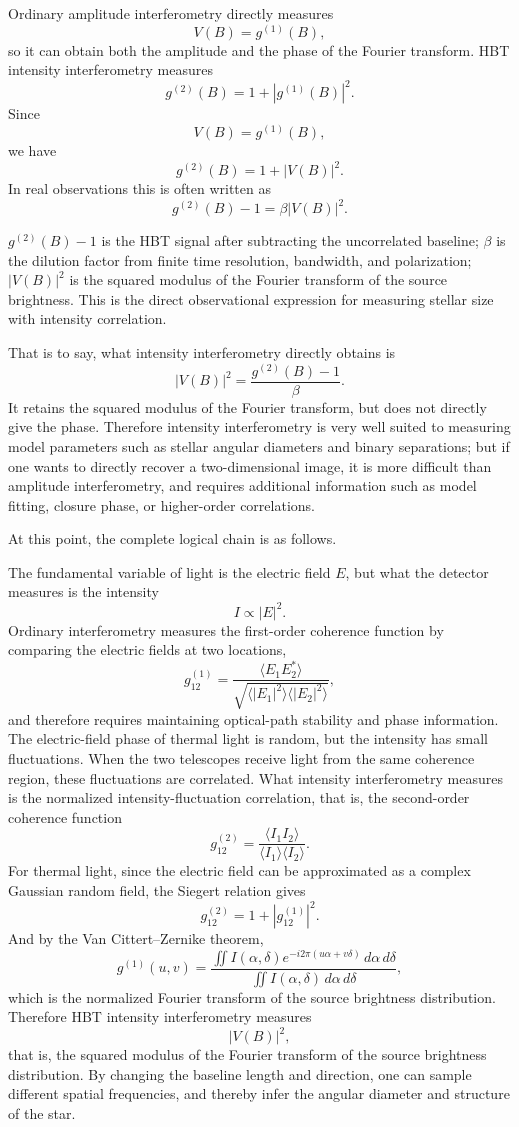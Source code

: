Ordinary amplitude interferometry directly measures
\[
  V(B)=g^{(1)}(B),
\]
so it can obtain both the amplitude and the phase of the Fourier transform. HBT intensity interferometry measures
\[
  g^{(2)}(B)=1+|g^{(1)}(B)|^2.
\]
Since
\[
  V(B)=g^{(1)}(B),
\]
we have
\[
  g^{(2)}(B)=1+|V(B)|^2.
\]
In real observations this is often written as
\[
  g^{(2)}(B)-1
  =
  \beta |V(B)|^2.
\]
\begin{formulaexplain}
\(g^{(2)}(B)-1\) is the HBT signal after subtracting the uncorrelated baseline; \(\beta\) is the dilution factor from finite time resolution, bandwidth, and polarization; \(|V(B)|^2\) is the squared modulus of the Fourier transform of the source brightness. This is the direct observational expression for measuring stellar size with intensity correlation.
\end{formulaexplain}
That is to say, what intensity interferometry directly obtains is
\[
  |V(B)|^2
  =
  \frac{g^{(2)}(B)-1}{\beta}.
\]
It retains the squared modulus of the Fourier transform, but does not directly give the phase. Therefore intensity interferometry is very well suited to measuring model parameters such as stellar angular diameters and binary separations; but if one wants to directly recover a two-dimensional image, it is more difficult than amplitude interferometry, and requires additional information such as model fitting, closure phase, or higher-order correlations.

At this point, the complete logical chain is as follows.

The fundamental variable of light is the electric field \(E\), but what the detector measures is the intensity
\[
  I\propto |E|^2.
\]
Ordinary interferometry measures the first-order coherence function by comparing the electric fields at two locations,
\[
  g^{(1)}_{12}
  =
  \frac{
    \langle E_1E_2^\ast\rangle
  }{
    \sqrt{
      \langle |E_1|^2\rangle
      \langle |E_2|^2\rangle
    }
  },
\]
and therefore requires maintaining optical-path stability and phase information. The electric-field phase of thermal light is random, but the intensity has small fluctuations. When the two telescopes receive light from the same coherence region, these fluctuations are correlated. What intensity interferometry measures is the normalized intensity-fluctuation correlation, that is, the second-order coherence function
\[
  g^{(2)}_{12}
  =
  \frac{
    \langle I_1I_2\rangle
  }{
    \langle I_1\rangle\langle I_2\rangle
  }.
\]
For thermal light, since the electric field can be approximated as a complex Gaussian random field, the Siegert relation gives
\[
  g^{(2)}_{12}
  =
  1+
  \left|g^{(1)}_{12}\right|^2.
\]
And by the Van Cittert--Zernike theorem,
\[
  g^{(1)}(u,v)
  =
  \frac{
    \iint
    I(\alpha,\delta)
    e^{-i2\pi(u\alpha+v\delta)}
    \,d\alpha\,d\delta
  }{
    \iint
    I(\alpha,\delta)
    \,d\alpha\,d\delta
  },
\]
which is the normalized Fourier transform of the source brightness distribution. Therefore HBT intensity interferometry measures
\[
  |V(B)|^2,
\]
that is, the squared modulus of the Fourier transform of the source brightness distribution. By changing the baseline length and direction, one can sample different spatial frequencies, and thereby infer the angular diameter and structure of the star.
